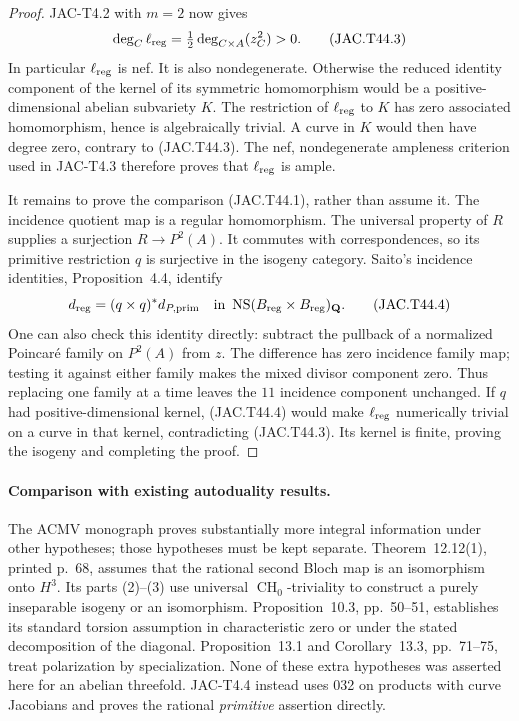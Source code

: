 \documentclass[11pt,a4paper]{article}
\begin{document}
\begin{proof}
JAC-T4.2 with $m=2$ now gives
\[
 \deg_C\ell_{\rm reg}
       =\tfrac12\deg_{C\times A}(z_C^2)>0.
                                                        \tag{JAC.T44.3}
\]
In particular $\ell_{\rm reg}$ is nef. It is also nondegenerate.
Otherwise the reduced identity component of the kernel of its
symmetric homomorphism would be a positive-dimensional abelian
subvariety $K$. The restriction of $\ell_{\rm reg}$ to $K$ has
zero associated homomorphism, hence is algebraically trivial. A
curve in $K$ would then have degree zero, contrary to
(JAC.T44.3). The nef, nondegenerate ampleness criterion used in
JAC-T4.3 therefore proves that $\ell_{\rm reg}$ is ample.

It remains to prove the comparison (JAC.T44.1), rather than assume
it. The incidence quotient map is a regular homomorphism. The
universal property of $R$ supplies a surjection
$R\to P^2(A)$. It commutes with correspondences, so its primitive
restriction $q$ is surjective in the isogeny category. Saito's
incidence identities, Proposition~4.4, identify
\[
 d_{\rm reg}=(q\times q)^*d_{P,\rm prim}
       \quad\hbox{in }\operatorname{NS}(B_{\rm reg}\times
                                      B_{\rm reg})_{\mathbf Q}.
                                                        \tag{JAC.T44.4}
\]
One can also check this identity directly: subtract the pullback
of a normalized Poincar\'e family on $P^2(A)$ from $z$. The
difference has zero incidence family map; testing it against either
family makes the mixed divisor component zero. Thus replacing one
family at a time leaves the $11$ incidence component unchanged.
If $q$ had positive-dimensional kernel, (JAC.T44.4) would make
$\ell_{\rm reg}$ numerically trivial on a curve in that kernel,
contradicting (JAC.T44.3). Its kernel is finite, proving the
isogeny and completing the proof.
\end{proof}

\paragraph{Comparison with existing autoduality results.}
The ACMV monograph proves substantially more integral information
under other hypotheses; those hypotheses must be kept separate.
Theorem~12.12(1), printed p.~68, assumes that the rational second
Bloch map is an isomorphism onto $H^3$. Its parts (2)--(3) use
universal $\operatorname{CH}_0$-triviality to construct a purely
inseparable isogeny or an isomorphism. Proposition~10.3, pp.~50--51,
establishes its standard torsion assumption in characteristic zero
or under the stated decomposition of the diagonal. Proposition~13.1
and Corollary~13.3, pp.~71--75, treat polarization by specialization.
None of these extra hypotheses was asserted here for an abelian
threefold. JAC-T4.4 instead uses 032 on products with curve Jacobians
and proves the rational \emph{primitive} assertion directly.
\end{document}
